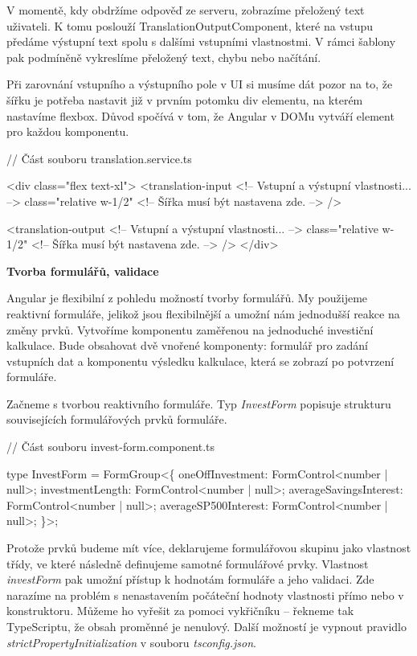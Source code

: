 V momentě, kdy obdržíme odpověď ze serveru, zobrazíme přeložený text uživateli. 
K tomu poslouží TranslationOutputComponent, které na vstupu předáme výstupní text spolu s dalšími vstupními vlastnostmi. 
V rámci šablony pak podmíněně vykreslíme přeložený text, chybu nebo načítání. 

Při zarovnání vstupního a výstupního pole v UI si musíme dát pozor na to, že šířku je potřeba nastavit již v prvním potomku div elementu, na kterém nastavíme flexbox. 
Důvod spočívá v tom, že Angular v DOMu vytváří element pro každou komponentu.

\begin{prog}
// Část souboru translation.service.ts

<div class="flex text-xl">
  <translation-input 
    <!-- Vstupní a výstupní vlastnosti... -->
    class="relative w-1/2"
    <!-- Šířka musí být nastavena zde. -->
  />

  <translation-output 
    <!-- Vstupní a výstupní vlastnosti... -->
    class="relative w-1/2"
    <!-- Šířka musí být nastavena zde. -->
  />
</div>
\end{prog}

\begin{flushleft}
  \textbf{Tvorba formulářů, validace}
\end{flushleft}

Angular je flexibilní z pohledu možností tvorby formulářů. My použijeme reaktivní formuláře, jelikož jsou flexibilnější a umožní nám jednodušší reakce na změny prvků.
Vytvoříme komponentu zaměřenou na jednoduché investiční kalkulace. 
Bude obsahovat dvě vnořené komponenty: formulář pro zadání vstupních dat a komponentu výsledku kalkulace, která se zobrazí po potvrzení formuláře.

Začneme s tvorbou reaktivního formuláře. Typ \emph{InvestForm} popisuje strukturu souvisejících formulářových prvků formuláře.

\begin{prog}
// Část souboru invest-form.component.ts

type InvestForm = FormGroup<\{
  oneOffInvestment: FormControl<number | null>;
  investmentLength: FormControl<number | null>;
  averageSavingsInterest: FormControl<number | null>;
  averageSP500Interest: FormControl<number | null>;
\}>;
\end{prog}

Protože prvků budeme mít více, deklarujeme formulářovou skupinu jako vlastnost třídy, ve které následně definujeme samotné formulářové prvky. 
Vlastnost \emph{investForm} pak umožní přístup k hodnotám formuláře a jeho validaci. Zde narazíme na problém s nenastavením počáteční hodnoty vlastnosti přímo nebo v konstruktoru. 
Můžeme ho vyřešit za pomoci vykřičníku -- řekneme tak TypeScriptu, že obsah proměnné je nenulový. Další možností je vypnout pravidlo \emph{strictPropertyInitialization} v souboru \emph{tsconfig.json}.

